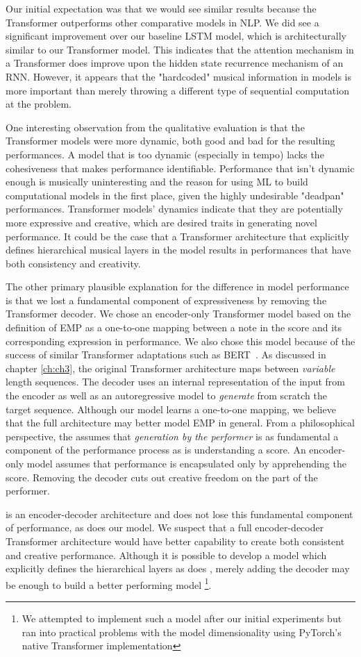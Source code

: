 Our initial expectation was that we would see similar results because the Transformer outperforms other comparative models in NLP. We did see a significant improvement over our baseline LSTM model, which is architecturally similar to our Transformer model. This indicates that the attention mechanism in a Transformer does improve upon the hidden state recurrence mechanism of an RNN. However, it appears that the "hardcoded" musical information in \vnet{} models is more important than merely throwing a different type of sequential computation at the problem.

One interesting observation from the qualitative evaluation is that the Transformer models were more dynamic, both good and bad for the resulting performances. A model that is too dynamic (especially in tempo) lacks the cohesiveness that makes performance identifiable. Performance that isn't dynamic enough is musically uninteresting and the reason for using ML to build computational models in the first place, given the highly undesirable "deadpan" performances. Transformer models' dynamics indicate that they are potentially more expressive and creative, which are desired traits in generating novel performance. It could be the case that a Transformer architecture that explicitly defines hierarchical musical layers in the model results in performances that have both consistency and creativity. 

The other primary plausible explanation for the difference in model performance is that we lost a fundamental component of expressiveness by removing the Transformer decoder. We chose an encoder-only Transformer model based on the \vnetf{} definition of EMP as a one-to-one mapping between a note in the score and its corresponding expression in performance. We also chose this model because of the success of similar Transformer adaptations such as BERT~\cite{devlin2018bert}. As discussed in chapter \ref{ch:ch3}, the original \ed{} Transformer architecture maps between \emph{variable} length sequences. The decoder uses an internal representation of the input from the encoder as well as an autoregressive model to \emph{generate} from scratch the target sequence. Although our model learns a one-to-one mapping, we believe that the full \ed{} architecture may better model EMP in general. From a philosophical perspective, the \ed{} assumes that \emph{generation by the performer} is as fundamental a component of the performance process as is understanding a score. An encoder-only model assumes that performance is encapsulated only by apprehending the score. Removing the decoder cuts out creative freedom on the part of the performer.

\vnet{} is an encoder-decoder architecture and does not lose this fundamental component of performance, as does our model. We suspect that a full encoder-decoder Transformer architecture would have better capability to create both consistent and creative performance. Although it is possible to develop a model which explicitly defines the hierarchical layers as does \vnet{}, merely adding the decoder may be enough to build a better performing model%
\footnote{We attempted to implement such a model after our initial experiments but ran into practical problems with the model dimensionality using PyTorch's native Transformer implementation}. 
